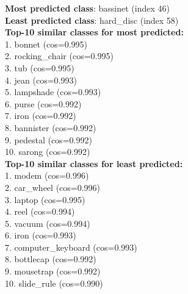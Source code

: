 
\textbf{Most predicted class}: bassinet (index 46)\\
\textbf{Least predicted class}: hard_disc (index 58)\\

\textbf{Top-10 similar classes for most predicted:}\\
1. bonnet (cos=0.995)\\
2. rocking_chair (cos=0.995)\\
3. tub (cos=0.995)\\
4. jean (cos=0.993)\\
5. lampshade (cos=0.993)\\
6. purse (cos=0.992)\\
7. iron (cos=0.992)\\
8. bannister (cos=0.992)\\
9. pedestal (cos=0.992)\\
10. sarong (cos=0.992)\\

\textbf{Top-10 similar classes for least predicted:}\\
1. modem (cos=0.996)\\
2. car_wheel (cos=0.996)\\
3. laptop (cos=0.995)\\
4. reel (cos=0.994)\\
5. vacuum (cos=0.994)\\
6. iron (cos=0.993)\\
7. computer_keyboard (cos=0.993)\\
8. bottlecap (cos=0.992)\\
9. mousetrap (cos=0.992)\\
10. slide_rule (cos=0.990)\\
